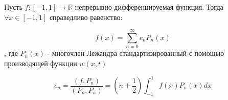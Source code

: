 \documentclass[12pt, a4paper]{report}
\begin{document}
\begin{theorem}
    Пусть \( f: [ -1, 1 ] \to  \mathbb{R}    \)  непрерывно дифференцируемая функция. Тогда \( \forall  x \in  [-1 ,1 ]  \)  справедливо равенство: 

    \[ f(x ) = \sum_{n= 0 }^{\infty  } c_n P_n (x)  \] 
    , где \( P_n(x) \) - многочлен Лежандра стандартизированный  с помощью производящей функции \( w(x,t) \) 

    \[ c_n = \frac{(f, P_n )}{(P_n,P_n)}  = \left( n+\frac{1}{2 }  \right) \int_{-1 }^{1 }  f(x ) P_n (x ) dx  \] 
\end{theorem}


\ifdefined\mainfile
\else
    
\end{document}
